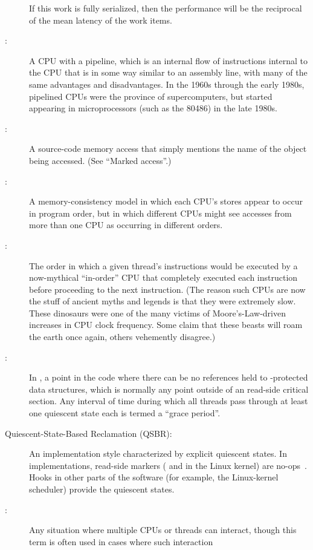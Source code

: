 \begin{description}
	If this work is fully serialized, then the performance will
	be the reciprocal of the mean latency of the work items.
\item[\IXGr{Pipelined CPU}:]
	A CPU with a pipeline, which is
	an internal flow of instructions internal to the CPU that
	is in some way similar to an assembly line, with many of
	the same advantages and disadvantages.
	In the 1960s through the early 1980s, pipelined CPUs were the
	province of supercomputers, but started appearing in microprocessors
	(such as the 80486) in the late 1980s.
\item[\IXG{Plain Access}:]
	A source-code memory access that simply mentions the name of
	the object being accessed.
	(See ``Marked access''.)
\item[\IXGh{Process}{Consistency}:]
	A memory-consistency model in which each CPU's stores appear to
	occur in program order, but in which different CPUs might see
	accesses from more than one CPU as occurring in different orders.
\item[\IXG{Program Order}:]
	The order in which a given thread's instructions
	would be executed by a now-mythical ``in-order'' CPU that
	completely executed each instruction before proceeding to
	the next instruction.
	(The reason such CPUs are now the stuff of ancient myths
	and legends is that they were extremely slow.
	These dinosaurs were one of the many victims of
	Moore's-Law-driven increases in CPU clock frequency.
	Some claim that these beasts will roam the earth once again,
	others vehemently disagree.)
\item[\IXG{Quiescent State}:]
	In , a point in the code where there can be no references held
	to -protected data structures, which is normally any point
	outside of an  read-side critical section.
	Any interval of time during which all threads pass through at
	least one quiescent state each is termed a ``grace period''.
\item[Quiescent-State-Based Reclamation (QSBR):]
	An  implementation style characterized by explicit quiescent
	states.
	In  implementations, read-side markers
	( and  in the Linux
	kernel) are no-ops~\cite{McKenney98,Slingwine95}.
	Hooks in other parts of the software (for example, the Linux-kernel
	scheduler) provide the quiescent states.
\item[\IXG{Race Condition}:]
	Any situation where multiple CPUs or threads can interact,
	though this term is often used in cases where such interaction

\end{description}
